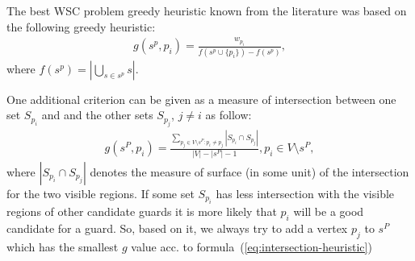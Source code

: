 \documentclass[runningheads,a4paper]{llncs}
\begin{document}
       The best WSC problem greedy heuristic known from the literature was based on the following greedy heuristic:
       \begin{align}
          g(s^p, p_i) = \frac{w_{p_i}}{ f(s^p \cup \{p_i\})  - f(s^p)},
       \end{align}
      where $f(s^p) = |\bigcup_{s \in s^p} s |$.
      
      One additional criterion can be given as a measure of intersection between one set  $S_{p_i}$ and 
      and the other sets $S_{p_j}$, $j \neq i$ as follow:
      \begin{align}\label{eq:intersection-heuristic}
      	   g(s^P,p_i) = \frac{\sum_{p_j \in V \setminus s^P: p_i \neq p_j}|S_{p_i} \cap S_{p_j}|}{|V|-|s^P|-1}, p_i \in V \setminus s^P,
      \end{align}
      where $|S_{p_i} \cap S_{p_j}|$ denotes the measure of surface (in some unit) of the intersection for the two 
      visible regions. If some set $S_{p_i}$ has less intersection with the  visible regions of other candidate guards it is more likely that $p_i$ will be a good candidate for a guard. So, based on it, we always try to  add a vertex $p_j$ to $s^P$ which has the smallest $g$ value acc. to formula~(\ref{eq:intersection-heuristic}) 
      
\end{document}
